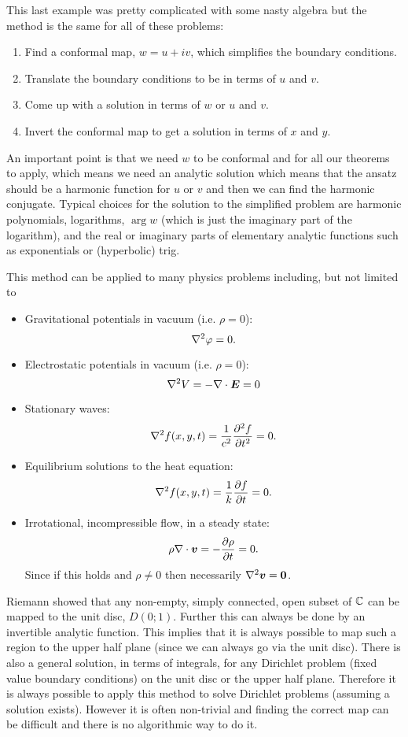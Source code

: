 \documentclass{article}
\newcommand{\discOpen}[2]{D\left({#1}; {#2}\right)}
\begin{document}
    This last example was pretty complicated with some nasty algebra but the method is the same for all of these problems:
    \begin{enumerate}
        \item Find a conformal map, \(w = u + iv\), which simplifies the boundary conditions.
        \item Translate the boundary conditions to be in terms of \(u\) and \(v\).
        \item Come up with a solution in terms of \(w\) or \(u\) and \(v\).
        \item Invert the conformal map to get a solution in terms of \(x\) and \(y\).
    \end{enumerate}
    An important point is that we need \(w\) to be conformal and for all our theorems to apply, which means we need an analytic solution which means that the ansatz should be a harmonic function for \(u\) or \(v\) and then we can find the harmonic conjugate.
    Typical choices for the solution to the simplified problem are harmonic polynomials, logarithms, \(\arg w\) (which is just the imaginary part of the logarithm), and the real or imaginary parts of elementary analytic functions such as exponentials or (hyperbolic) trig.
    
    This method can be applied to many physics problems including, but not limited to
    \begin{itemize}
        \item Gravitational potentials in vacuum (i.e. \(\rho = 0\)):
        \[\nabla^2 \varphi = 0.\]
        \item Electrostatic potentials in vacuum (i.e. \(\rho = 0\)):
        \[\nabla^2 V = -\nabla\cdot\bm{E} = 0\]
        \item Stationary waves:
        \[\nabla^2 f(x, y, t) = \frac{1}{c^2}\pdv[2]{f}{t} = 0.\]
        \item Equilibrium solutions to the heat equation:
        \[\nabla^2 f(x, y, t) = \frac{1}{k}\pdv{f}{t} = 0.\]
        \item Irrotational, incompressible flow, in a steady state:
        \[\rho\nabla\cdot\bm{v} = -\pdv{\rho}{t} = 0.\]
        Since if this holds and \(\rho \ne 0\) then necessarily \(\nabla^2\bm{v} = \bm{0}\).
    \end{itemize}
    Riemann showed that any non-empty, simply connected, open subset of \(\mathbb{C}\) can be mapped to the unit disc, \(\discOpen{0}{1}\).
    Further this can always be done by an invertible analytic function.
    This implies that it is always possible to map such a region to the upper half plane (since we can always go via the unit disc).
    There is also a general solution, in terms of integrals, for any Dirichlet problem (fixed value boundary conditions) on the unit disc or the upper half plane.
    Therefore it is always possible to apply this method to solve Dirichlet problems (assuming a solution exists).
    However it is often non-trivial and finding the correct map can be difficult and there is no algorithmic way to do it.
\end{document}
